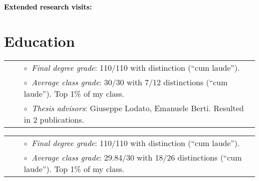\documentclass[a4paper]{moderncv}
\begin{document}
\vspace{0.2cm}
\textbf{\textcolor{black}{Extended research visits:}}\vspace{0.05cm}\\
 \vspace{-0.1cm}
 \vspace{-0.1cm}


\section{Education}

\vspace{-0.1cm}
\begin{tabular}{rcl}
&\hspace{0.4cm} &$\circ\;\;${\textit{Final degree grade}}: 110/110 with distinction (``cum laude'').\\
&\hspace{0.4cm} &$\circ\;\;${\textit{Average class grade}}: 30/30 with 7/12 distinctions (``cum laude''). Top 1\% of my class.\\
&\hspace{0.4cm} &$\circ\;\;${\textit{Thesis advisors}}: Giuseppe Lodato, Emanuele Berti.  Resulted in 2 publications.\\
\end{tabular}

\vspace{0.2cm}
\vspace{-0.1cm}
\begin{tabular}{rcl}
&\hspace{0.4cm} &$\circ\;\;${\textit{Final degree grade}}: 110/110 with distinction (``cum laude'').\\
&\hspace{0.4cm} &$\circ\;\;${\textit{Average class grade}}: 29.84/30 with 18/26 distinctions (``cum laude''). Top 1\% of my class.\\
\end{tabular}
\end{document}
